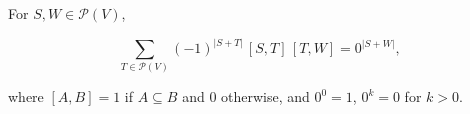 For $S, W \in \mathcal{P}(V)$,

$$\sum_{T \in \mathcal{P}(V)} (-1)^{|S+T|}\,[S, T]\,[T, W] = 0^{|S+W|},$$

where $[A, B] = 1$ if $A \subseteq B$ and $0$ otherwise, and $0^0 = 1$, $0^k = 0$ for $k > 0$.
